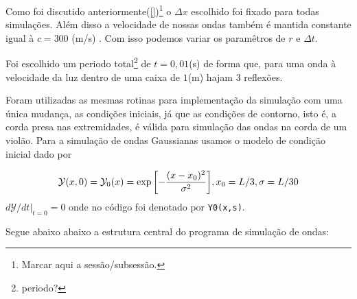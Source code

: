 \documentclass[a4paper, 11pt]{article}
\begin{document}
Como foi discutido anteriormente(\ref{})\footnote{Marcar aqui a sessão/subsessão.} o $\Delta x$ escolhido
foi fixado para todas simulações. Além disso a velocidade de nossas ondas também é mantida constante
igual à \( c = 300\) (m/s)  . Com isso podemos variar os paramêtros de \( r \) e \( \Delta t \). 

Foi escolhido um periodo total\footnote{periodo?} de \( t = 0,01\)(s)  de forma que, para uma onda à velocidade da luz
dentro de uma caixa de \( 1\)(m) hajam 3 reflexões.


Foram utilizadas as mesmas rotinas para implementação da simulação com uma única mudança, as
condições iniciais, já que as condições de contorno, isto é, a corda presa nas extremidades, é
válida para simulação das ondas na corda de um violão. Para a simulação de ondas Gaussianas usamos o
modelo de condição inicial dado por 

\begin{equation}
    \mathcal{Y}(x, 0) = \mathcal{Y}_0 (x) = \exp{\left[- \frac{(x-x_0)^2}{\sigma^2}\right]}, x_0 = L/3, \sigma = L/30 \\
  \label{eq:y_0}
\end{equation}
\( d \mathcal{Y} / d t |_{t = 0} = 0 \)
onde no código foi denotado por  \verb|Y0(x,s)|.


Segue abaixo abaixo a estrutura central do programa de simulação de ondas:
\end{document}
